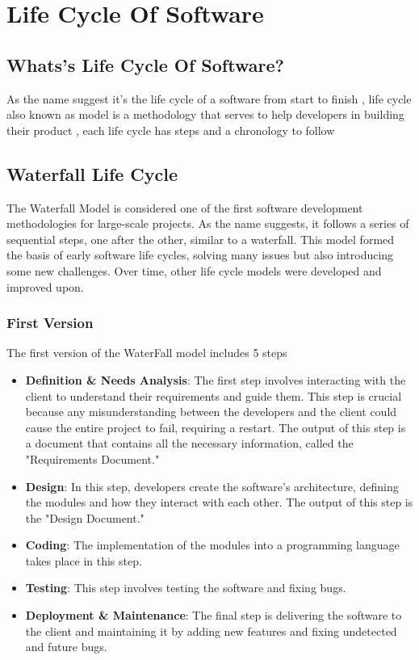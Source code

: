 \section{Life Cycle Of Software}
\subsection{Whats's Life Cycle Of Software?}
As the name suggest it's the life cycle of a software from start to finish , life cycle also known as model is a methodology
that serves to help developers in building their product , each life cycle has steps and a chronology to follow

\subsection{Waterfall Life Cycle}
The Waterfall Model is considered one of the first software development methodologies for large-scale 
projects. As the name suggests, it follows a series of sequential steps, one after the other, similar to a waterfall. This model
formed the basis of early software life cycles, solving many issues but also introducing some new challenges. Over time, 
other life cycle models were developed and improved upon.

\subsubsection{First Version}
The first version of the WaterFall model includes 5 steps

\begin{itemize}
    \item \textbf{Definition \& Needs Analysis}: The first step involves interacting with the client to understand their 
    requirements and guide them. This step is crucial because any misunderstanding between the developers and the client 
    could cause the entire project to fail, requiring a restart. The output of this step is a document that contains all
    the necessary information, called the "Requirements Document."
    
    \item \textbf{Design}: In this step, developers create the software's architecture, defining the modules and how they
    interact with each other. The output of this step is the "Design Document."
    
    \item \textbf{Coding}: The implementation of the modules into a programming language takes place in this step.
    
    \item \textbf{Testing}: This step involves testing the software and fixing bugs.
    
    \item \textbf{Deployment \& Maintenance}: The final step is delivering the software to the client and maintaining it 
    by adding new features and fixing undetected and future bugs.
\end{itemize}

